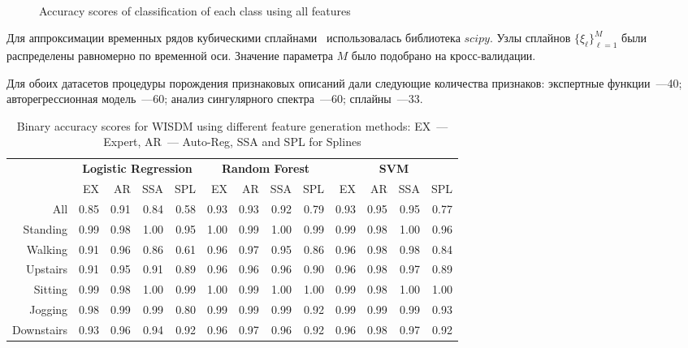 \begin{figure}[!ht]
	\\
	\caption{Accuracy scores of classification of each class using all features}
	\label{fig::feature_union_results}
\end{figure}

Для аппроксимации временных рядов кубическими сплайнами~\cite{deboor1978splines} использовалась библиотека $scipy$. 
Узлы сплайнов $\{\xi_{\ell}\}_{\ell = 1}^M$ были распределены равномерно по временной оси.
Значение параметра $M$ было подобрано на кросс-валидации.

Для обоих датасетов процедуры порождения признаковых описаний дали следующие количества признаков: экспертные функции~---40; авторегрессионная модель~---60; анализ сингулярного спектра~---60; сплайны~---33.

\begin{table}[!ht]
	\centering
	\caption{Binary accuracy scores for WISDM using different feature generation methods: EX~--- Expert, AR~--- Auto-Reg, SSA and  SPL for Splines}
	\footnotesize
	\begin{tabular}{r|rrrr|rrrr|rrrr|}
		& \multicolumn{4}{c|}{\textbf{Logistic Regression}} & \multicolumn{4}{c|}{\textbf{Random Forest}} & \multicolumn{4}{c|}{\textbf{SVM}}          \\ \cline{2-13} 
		& EX   & AR   & SSA   & SPL  & EX  & AR & SSA & SPL & EX & AR & SSA & SPL \\ \hline
		All& 0.85 & 0.91 & 0.84 & 0.58 & 0.93 & 0.93 & 0.92 & 0.79 & 0.93 & 0.95 & 0.95 & 0.77 \\
		Standing& 0.99 & 0.98 & 1.00 & 0.95 & 1.00 & 0.99 & 1.00 & 0.99 & 0.99 & 0.98 & 1.00 & 0.96 \\
		Walking& 0.91 & 0.96 & 0.86 & 0.61 & 0.96 & 0.97 & 0.95 & 0.86 & 0.96 & 0.98 & 0.98 & 0.84 \\
		Upstairs& 0.91 & 0.95 & 0.91 & 0.89 & 0.96 & 0.96 & 0.96 & 0.90 & 0.96 & 0.98 & 0.97 & 0.89 \\
		Sitting& 0.99 & 0.98 & 1.00 & 0.99 & 1.00 & 0.99 & 1.00 & 1.00 & 0.99 & 0.98 & 1.00 & 1.00 \\
		Jogging& 0.98 & 0.99 & 0.99 & 0.80 & 0.99 & 0.99 & 0.99 & 0.92 & 0.99 & 0.99 & 0.99 & 0.93 \\
		Downstairs& 0.93 & 0.96 & 0.94 & 0.92 & 0.96 & 0.97 & 0.96 & 0.92 & 0.96 & 0.98 & 0.97 & 0.92 \\ \hline
	\end{tabular}
	\label{tbl::wisdm_methods_results}
\end{table}

